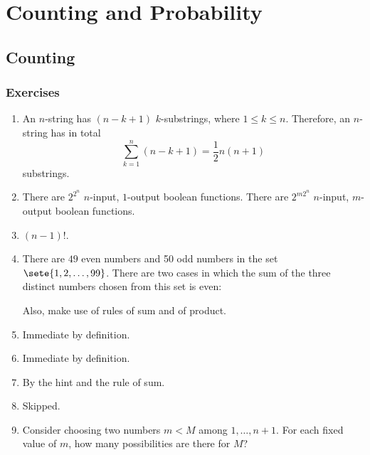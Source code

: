 \setcounter{chapter}{2}
\chapter{Counting and Probability}
\section{Counting}
\subsection*{Exercises}
\begin{enumerate}[\thesection-1]
%
\item An $n$-string has $(n - k + 1)$ $k$-substrings, where $1 \leq k \leq n$. Therefore, an $n$-string has in total
\[
\sum^n_{k = 1} (n - k + 1) = \frac{1}{2}n(n + 1)
\]
substrings.
%
\item There are $2^{2^n}$ $n$-input, $1$-output boolean functions. There are $2^{m2^n}$ $n$-input, $m$-output boolean functions.
%
\item $(n - 1)!$.
%
\item There are $49$ even numbers and 50 odd numbers in the set $\sete{1, 2, \ldots, 99}$. There are two cases in which the sum of the three distinct numbers chosen from this set is even:  Also, make use of rules of sum and of product.
%
\item Immediate by definition.
%
\item Immediate by definition.
%
\item By the hint and the rule of sum.
%
\item Skipped.
%
\item Consider choosing two numbers $m < M$ among $1, \ldots, n + 1$. For each fixed value of $m$, how many possibilities are there for $M$?
%
\end{enumerate}
